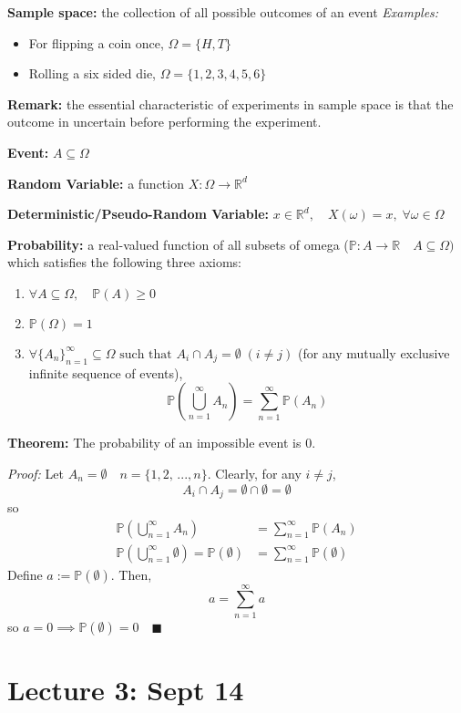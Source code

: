 \documentclass[12pt]{article}
\renewcommand{\P}{\mathbb{P}}
\newcommand{\R}{\mathbb{R}}
\newcommand{\qed}{\quad \blacksquare}
\begin{document}
\textbf{Sample space:} the collection of all possible outcomes of an event 
\emph{Examples:}
\begin{itemize}
    \item For flipping a coin once, $\Omega = \{H, T\}$
    \item Rolling a six sided die, $\Omega = \{1, 2, 3, 4, 5, 6\}$
\end{itemize}

\textbf{Remark:} the essential characteristic of experiments in sample space is that the outcome in uncertain before performing the experiment.

\textbf{Event:} $A \subseteq \Omega$

\textbf{Random Variable:} a function $X: \Omega \to \R^d$ 

\textbf{Deterministic/Pseudo-Random Variable:} $x \in \R^d, \quad X(\omega) = x, \; \forall \omega \in \Omega$

\textbf{Probability:} a real-valued function of all subsets of omega ($\P: A \to \R \quad A \subseteq \Omega)$ which satisfies the following three axioms:
\begin{enumerate}
    \item $\forall A \subseteq \Omega, \quad \P(A) \geq 0$
    \item $\P(\Omega) = 1$
    \item $\forall \{A_n\}_{n=1}^\infty \subseteq \Omega \text{ such that } A_i \cap A_j = \emptyset \; (i \neq j)$ (for any mutually exclusive infinite sequence of events),
    \[\P\left(\bigcup_{n=1}^\infty A_n\right) = \sum_{n=1}^\infty \P(A_n)\]
\end{enumerate}

\textbf{Theorem:} The probability of an impossible event is 0.

\emph{Proof:} 
Let $A_n = \emptyset \quad n = \{1, 2, \,..., n\}$. Clearly, for any $i \neq j$, 
\[A_i \cap A_j = \emptyset \cap \emptyset = \emptyset\] 
so 
\begin{align*}
    \P\left(\bigcup_{n=1}^\infty A_n\right) &= \sum_{n=1}^\infty \P(A_n)\\
    \P\left(\bigcup_{n=1}^\infty \emptyset\right) = \P(\emptyset) &= \sum_{n=1}^\infty \P(\emptyset)
\end{align*}
Define $a := \P(\emptyset)$. Then, 
\[a = \sum_{n=1}^\infty a\]
so $a = 0 \implies \P(\emptyset) = 0 \qed$

\section{Lecture 3: Sept 14}
\end{document}
